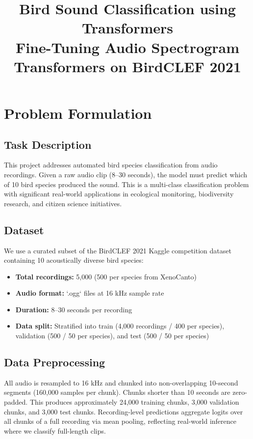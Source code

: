 \documentclass[11pt, a4paper]{article}
\title{\textbf{Bird Sound Classification using Transformers} \\
       Fine-Tuning Audio Spectrogram Transformers on BirdCLEF 2021}
\author{}
\date{}
\begin{document}
\maketitle

\section{Problem Formulation}

\subsection{Task Description}
This project addresses automated bird species classification from audio recordings. Given a raw audio clip (8--30 seconds), the model must predict which of 10 bird species produced the sound. This is a multi-class classification problem with significant real-world applications in ecological monitoring, biodiversity research, and citizen science initiatives.

\subsection{Dataset}
We use a curated subset of the BirdCLEF 2021 Kaggle competition dataset containing 10 acoustically diverse bird species:
\begin{itemize}
  \item \textbf{Total recordings:} 5,000 (500 per species from XenoCanto)
  \item \textbf{Audio format:} `.ogg` files at 16 kHz sample rate
  \item \textbf{Duration:} 8--30 seconds per recording
  \item \textbf{Data split:} Stratified into train (4,000 recordings / 400 per species), validation (500 / 50 per species), and test (500 / 50 per species)
\end{itemize}

\subsection{Data Preprocessing}
All audio is resampled to 16 kHz and chunked into non-overlapping 10-second segments (160,000 samples per chunk). Chunks shorter than 10 seconds are zero-padded. This produces approximately 24,000 training chunks, 3,000 validation chunks, and 3,000 test chunks. Recording-level predictions aggregate logits over all chunks of a full recording via mean pooling, reflecting real-world inference where we classify full-length clips.
\end{document}
